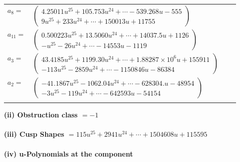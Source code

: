 \documentclass[1p]{elsarticle_modified}
\theoremstyle{definition}
\begin{document}
\begin{tabular}{m{7pt} m{180pt} m{7pt} m{180pt} }
\flushright $a_{8}=$&$\begin{pmatrix}4.25011 u^{25}+105.753 u^{24}+\cdots-539.268 u-555\\9 u^{25}+233 u^{24}+\cdots+150013 u+11755\end{pmatrix}$ \\
\flushright $a_{11}=$&$\begin{pmatrix}0.500223 u^{25}+13.5060 u^{24}+\cdots+14037.5 u+1126\\- u^{25}-26 u^{24}+\cdots-14553 u-1119\end{pmatrix}$ \\
\flushright $a_{3}=$&$\begin{pmatrix}43.4185 u^{25}+1199.30 u^{24}+\cdots+1.88287\times10^{6} u+155911\\-113 u^{25}-2859 u^{24}+\cdots-1150846 u-86384\end{pmatrix}$ \\
\flushright $a_{2}=$&$\begin{pmatrix}-41.1867 u^{25}-1062.04 u^{24}+\cdots-628304. u-48954\\-3 u^{25}-119 u^{24}+\cdots-642593 u-54154\end{pmatrix}$\\&\end{tabular}
\flushleft \textbf{(ii) Obstruction class $= -1$}\\~\\
\flushleft \textbf{(iii) Cusp Shapes $= 115 u^{25}+2941 u^{24}+\cdots+1504608 u+115595$}\\~\\
\newpage\renewcommand{\arraystretch}{1}
\flushleft \textbf{(iv) u-Polynomials at the component}\newline \\
\end{document}
